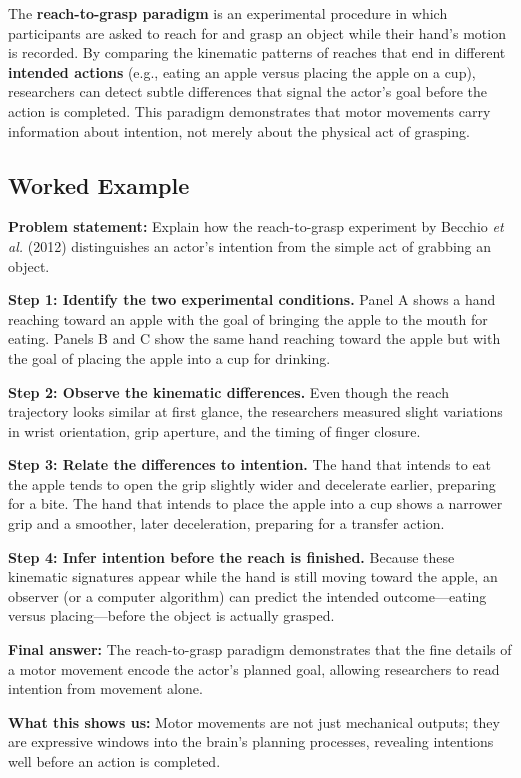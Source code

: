 \documentclass[12pt, a4paper]{article}
\begin{document}
The \textbf{reach-to-grasp paradigm} is an experimental procedure in which participants are asked to reach for and grasp an object while their hand's motion is recorded.  By comparing the kinematic patterns of reaches that end in different \textbf{intended actions} (e.g., eating an apple versus placing the apple on a cup), researchers can detect subtle differences that signal the actor's goal before the action is completed.  This paradigm demonstrates that motor movements carry information about intention, not merely about the physical act of grasping.

\subsection{Worked Example}
\textbf{Problem statement:}  Explain how the reach-to-grasp experiment by Becchio \emph{et al.} (2012) distinguishes an actor's intention from the simple act of grabbing an object.  

\textbf{Step 1: Identify the two experimental conditions.}  
Panel A shows a hand reaching toward an apple with the goal of bringing the apple to the mouth for eating.  
Panels B and C show the same hand reaching toward the apple but with the goal of placing the apple into a cup for drinking.  

\textbf{Step 2: Observe the kinematic differences.}  
Even though the reach trajectory looks similar at first glance, the researchers measured slight variations in wrist orientation, grip aperture, and the timing of finger closure.  

\textbf{Step 3: Relate the differences to intention.}  
The hand that intends to eat the apple tends to open the grip slightly wider and decelerate earlier, preparing for a bite.  
The hand that intends to place the apple into a cup shows a narrower grip and a smoother, later deceleration, preparing for a transfer action.  

\textbf{Step 4: Infer intention before the reach is finished.}  
Because these kinematic signatures appear while the hand is still moving toward the apple, an observer (or a computer algorithm) can predict the intended outcome---eating versus placing---before the object is actually grasped.  

\textbf{Final answer:}  The reach-to-grasp paradigm demonstrates that the fine details of a motor movement encode the actor's planned goal, allowing researchers to read intention from movement alone.  

\textbf{What this shows us:}  Motor movements are not just mechanical outputs; they are expressive windows into the brain's planning processes, revealing intentions well before an action is completed.
\end{document}
